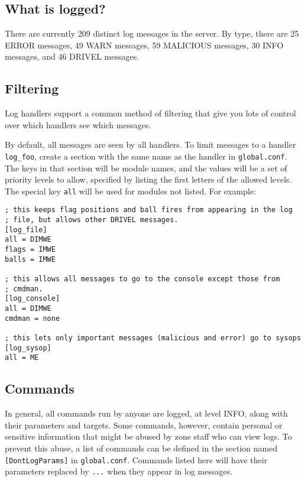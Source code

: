 \documentclass{article}
\begin{document}
\subsection{What is logged?}

There are currently
209
distinct log messages in the server. By type, there are 25 ERROR
messages, 49 WARN messages, 59 MALICIOUS messages, 30 INFO messages, and
46 DRIVEL messages.

\subsection{Filtering}

Log handlers support a common method of filtering that give you lots of
control over which handlers see which messages.

By default, all messages are seen by all handlers. To limit messages to
a handler \verb/log_foo/, create a section with the same name as the
handler in \verb/global.conf/. The keys in that section will be module
names, and the values will be a set of priority levels to allow,
specified by listing the first letters of the allowed levels. The
special key \verb/all/ will be used for modules not listed. For example:

\begin{verbatim}
; this keeps flag positions and ball fires from appearing in the log
; file, but allows other DRIVEL messages.
[log_file]
all = DIMWE
flags = IMWE
balls = IMWE

; this allows all messages to go to the console except those from
; cmdman.
[log_console]
all = DIMWE
cmdman = none

; this lets only important messages (malicious and error) go to sysops
[log_sysop]
all = ME
\end{verbatim}


\subsection{Commands}

In general, all commands run by anyone are logged, at level INFO, along
with their parameters and targets. Some commands, however, contain
personal or sensitive information that might be abused by zone staff who
can view logs. To prevent this abuse, a list of commands can be defined
in the section named \verb/[DontLogParams]/ in \verb/global.conf/.
Commands listed here will have their parameters replaced by \verb/.../
when they appear in log messages.
\end{document}
